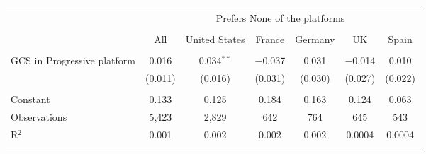 
\begin{tabular}{@{\extracolsep{5pt}}lcccccc} 
\\[-1.8ex]\hline 
\hline \\[-1.8ex] 
 & \multicolumn{6}{c}{Prefers None of the platforms} \\ 
\cline{2-7} 
\\[-1.8ex] & All & United States & France & Germany & UK & Spain \\ 
\hline \\[-1.8ex] 
 GCS in Progressive platform & 0.016 & 0.034$^{**}$ & $-$0.037 & 0.031 & $-$0.014 & 0.010 \\ 
  & (0.011) & (0.016) & (0.031) & (0.030) & (0.027) & (0.022) \\ 
 \hline \\[-1.8ex] 
Constant & 0.133 & 0.125 & 0.184 & 0.163 & 0.124 & 0.063 \\ 
Observations & 5,423 & 2,829 & 642 & 764 & 645 & 543 \\ 
R$^{2}$ & 0.001 & 0.002 & 0.002 & 0.002 & 0.0004 & 0.0004 \\ 
\hline 
\hline \\[-1.8ex] 
\end{tabular} 
